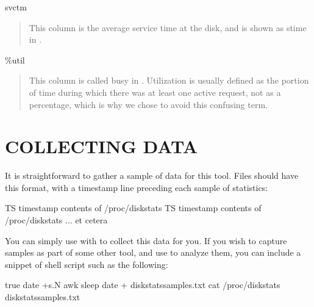 \documentclass[letterpaper,10pt,english]{sphinxmanual}
\begin{document}
\sphinxAtStartPar
svctm
\begin{quote}

\sphinxAtStartPar
This column is the average service time at the disk, and is shown as stime in
.
\end{quote}

\sphinxAtStartPar
\%util
\begin{quote}

\sphinxAtStartPar
This column is called busy in .  Utilization is usually defined as
the portion of time during which there was at least one active request, not as a
percentage, which is why we chose to avoid this confusing term.
\end{quote}


\section{COLLECTING DATA}
\label{\detokenize{mariadb-iostat:collecting-data}}
\sphinxAtStartPar
It is straightforward to gather a sample of data for this tool.  Files should
have this format, with a timestamp line preceding each sample of statistics:

\begin{sphinxVerbatim}[commandchars=\\\{\}]
TS \PYGZlt{}timestamp\PYGZgt{}
\PYGZlt{}contents of /proc/diskstats\PYGZgt{}
TS \PYGZlt{}timestamp\PYGZgt{}
\PYGZlt{}contents of /proc/diskstats\PYGZgt{}
... et cetera
\end{sphinxVerbatim}

\sphinxAtStartPar
You can simply use  with {\hyperref[\detokenize{mariadb-iostat:cmdoption-mariadb-iostat-save-samples}]{}} to collect this data
for you.  If you wish to capture samples as part of some other tool, and use
 to analyze them, you can include a snippet of shell script such as
the following:

\begin{sphinxVerbatim}[commandchars=\\\{\}]
 true 
   date +\PYGZpc{}s.\PYGZpc{}N  awk 
   sleep 
   date + \PYGZgt{}\PYGZgt{} diskstats\PYGZhy{}samples.txt
   cat /proc/diskstats \PYGZgt{}\PYGZgt{} diskstats\PYGZhy{}samples.txt
\end{sphinxVerbatim}
\end{document}
